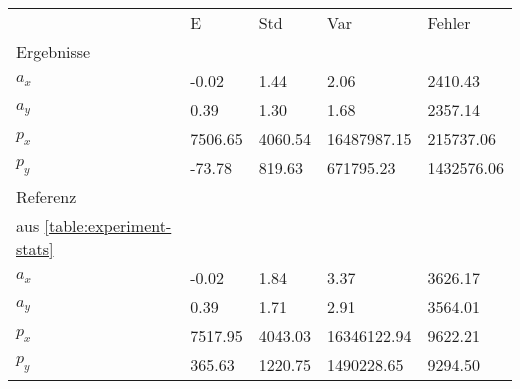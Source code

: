 \begin{tabular}{l|l|l|l|l}

     & E   & Std    & Var    & Fehler \\
\hhline{=|=|=|=|=}

Ergebnisse & & & & \\
$a_x$  &        -0.02 &         1.44 &         2.06 &      2410.43 \\
$a_y$  &         0.39 &         1.30 &         1.68 &      2357.14 \\
$p_x$  &      7506.65 &      4060.54 &  16487987.15 &    215737.06 \\
$p_y$  &       -73.78 &       819.63 &    671795.23 &   1432576.06 \\

\hline
Referenz & & & & \\
aus \ref{table:experiment-stats} & & & & \\
$a_x$  &        -0.02 &         1.84 &         3.37 &      3626.17 \\
$a_y$  &         0.39 &         1.71 &         2.91 &      3564.01 \\
$p_x$  &      7517.95 &      4043.03 &  16346122.94 &      9622.21 \\
$p_y$  &       365.63 &      1220.75 &   1490228.65 &      9294.50 \\
\end{tabular}
